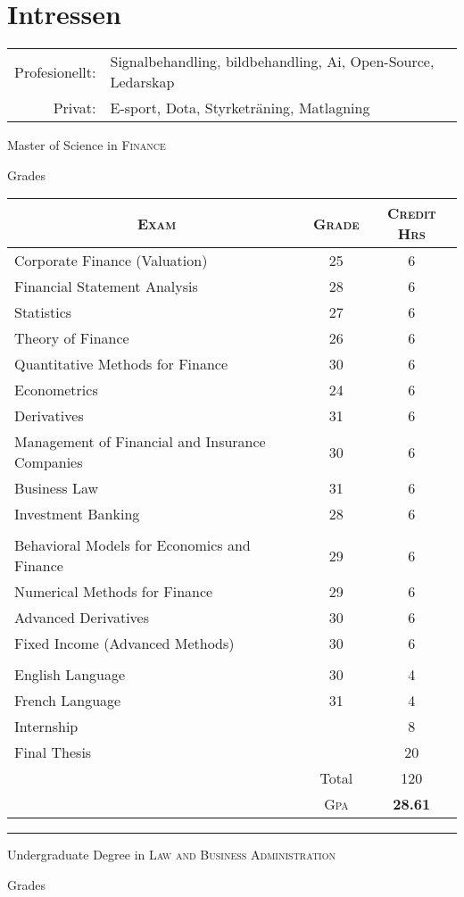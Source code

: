 \documentclass[a4paper,10pt]{article}
\begin{document}
\section{Intressen}
\begin{tabular}{rl}
    Profesionellt:& Signalbehandling, bildbehandling, Ai, Open-Source, Ledarskap  \\
    Privat:& E-sport, Dota, Styrketräning, Matlagning\\
\end{tabular}

\newpage
\par{\centering\Large \hypertarget{grds}{Master of Science in \textsc{Finance}}\par}\large{\centering Grades\par}\normalsize
\begin{center}
\begin{tabular}{lcc}
\multicolumn{1}{c}{\textsc{Exam}}&\textsc{Grade}&\textsc{Credit Hrs}\\ \hline
Corporate Finance (Valuation)	&25&	6\\
Financial Statement Analysis	&28&	6\\
Statistics	&27&	6\\
Theory of Finance	&26&	6\\
Quantitative Methods for Finance	&30&	6\\
Econometrics	&24	&6\\
Derivatives	&31&	6\\
Management of Financial and Insurance Companies	&30&	6\\
Business Law	&31&	6\\
Investment Banking	&28&	6\\ \\
		
Behavioral Models for Economics and Finance	&29&	6\\
Numerical Methods for Finance	&29&	6\\
Advanced Derivatives	&30&	6\\
Fixed Income (Advanced Methods)	&30&	6\\ \\
		
English Language	&30&	4\\
French Language	&31&	4\\
		
Internship	&	&8\\
		
Final Thesis	&	&20\\
		
		& Total&120\\\cline{2-3}
&\textsc{Gpa}&\textbf{28.61}
\end{tabular}
\end{center}
\bigskip
\hrule
\bigskip
\par{\centering\Large \hypertarget{grds_cleli}{Undergraduate Degree in \textsc{Law and Business Administration}}\par}\large{\centering Grades\par}\normalsize
\end{document}
